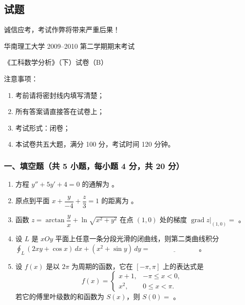 \subsection{试题}
诚信应考，考试作弊将带来严重后果！

华南理工大学 2009--2010 第二学期期末考试

《工科数学分析》（下）试卷（B）

注意事项：
\begin{enumerate}
  \item 考前请将密封线内填写清楚；
  \item 所有答案请直接答在试卷上；
  \item 考试形式：闭卷；
  \item 本试卷共五大题，满分 100 分，考试时间 120 分钟。
\end{enumerate}

\subsubsection*{一、填空题（共 5 小题，每小题 4 分，共 20 分）}
\begin{enumerate}
  \item 方程 $y''+5y'+4=0$ 的通解为 \underline{\hspace{4cm}}。
  \item 原点到平面 $x+\dfrac{y}{-4}+\dfrac{z}{3}=1$ 的距离为 \underline{\hspace{3cm}}。
  \item 函数 $z=\arctan\dfrac{y}{x}+\ln\sqrt{x^2+y^2}$ 在点 $(1,0)$ 处的梯度 $\operatorname{grad}z\big|_{(1,0)}=$ \underline{\hspace{3cm}}。
  \item 设 $L$ 是 $xOy$ 平面上任意一条分段光滑的闭曲线，则第二类曲线积分
  \(\displaystyle \oint_L(2xy+\cos x)\,dx+(x^2+\sin y)\,dy=\underline{\hspace{3cm}}\)。
  \item 设 $f(x)$ 是以 $2\pi$ 为周期的函数，它在 $[-\pi,\pi]$ 上的表达式是
  \[
  f(x)=
  \begin{cases}
  x+1,&-\pi\le x<0,\\
  x^2,&0\le x<\pi.
  \end{cases}
  \]
  若它的傅里叶级数的和函数为 $S(x)$，则 $S(0)=$ \underline{\hspace{3cm}}。
\end{enumerate}

